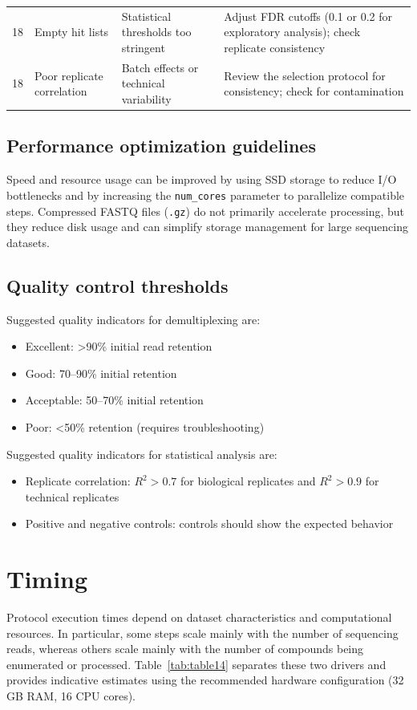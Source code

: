 \documentclass[pdflatex,sn-nature]{sn-jnl}
\begin{document}
\begin{table}[htbp]
\begin{tabular}{p{2.0cm}p{3.0cm}p{3.8cm}p{5.6cm}}
18 & Empty hit lists & Statistical thresholds too stringent & Adjust FDR cutoffs (0.1 or 0.2 for exploratory analysis); check replicate consistency \\
18 & Poor replicate correlation & Batch effects or technical variability & Review the selection protocol for consistency; check for contamination \\
\bottomrule
\end{tabular}
\end{table}

\subsection{Performance optimization guidelines}
Speed and resource usage can be improved by using SSD storage to reduce I/O bottlenecks and by increasing the \texttt{num\_cores} parameter to parallelize compatible steps. Compressed FASTQ files (\texttt{.gz}) do not primarily accelerate processing, but they reduce disk usage and can simplify storage management for large sequencing datasets.

\subsection{Quality control thresholds}
Suggested quality indicators for demultiplexing are:

\begin{itemize}
  \item Excellent: \textgreater{}90\% initial read retention
  \item Good: 70--90\% initial retention
  \item Acceptable: 50--70\% initial retention
  \item Poor: \textless{}50\% retention (requires troubleshooting)
\end{itemize}
Suggested quality indicators for statistical analysis are:

\begin{itemize}
  \item Replicate correlation: $R^2 > 0.7$ for biological replicates and $R^2 > 0.9$ for technical replicates
  \item Positive and negative controls: controls should show the expected behavior
\end{itemize}

\section{Timing}
\label{sec:timing}
Protocol execution times depend on dataset characteristics and computational resources. In particular, some steps scale mainly with the number of sequencing reads, whereas others scale mainly with the number of compounds being enumerated or processed. Table~\ref{tab:table14} separates these two drivers and provides indicative estimates using the recommended hardware configuration (32 GB RAM, 16 CPU cores).
\end{document}
